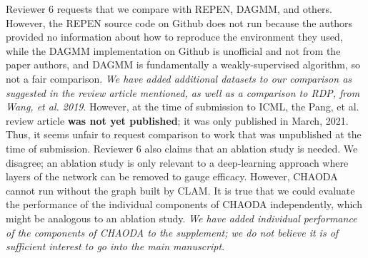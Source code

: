 \documentclass{article}
\begin{document}
Reviewer 6 requests that we compare with REPEN, DAGMM, and others.
However, the REPEN source code on Github does not run because the authors provided no information about how to reproduce the environment they used, while the DAGMM implementation on Github is unofficial and not from the paper authors, and DAGMM is fundamentally a weakly-supervised algorithm, so not a fair comparison.
\emph{We have added additional datasets to our comparison as suggested in the review article mentioned, as well as a comparison to RDP, from Wang, et al. 2019}.
However, at the time of submission to ICML, the Pang, et al. review article \textbf{was not yet published}; it was only published in March, 2021.
Thus, it seems unfair to request comparison to work that was unpublished at the time of submission.
Reviewer 6 also claims that an ablation study is needed.
We disagree; an ablation study is only relevant to a deep-learning approach where layers of the network can be removed to gauge efficacy.
However, CHAODA cannot run without the graph built by CLAM.
It is true that we could evaluate the performance of the individual components of CHAODA independently, which might be analogous to an ablation study.
\emph{We have added individual performance of the components of CHAODA to the supplement; we do not believe it is of sufficient interest to go into the main manuscript}.
\end{document}
